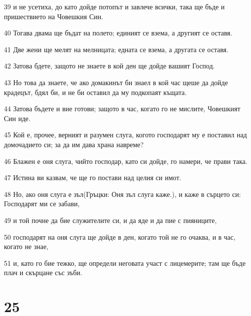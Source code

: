 \par 39 и не усетиха, до като дойде потопът и завлече всички, така ще бъде и пришествието на Човешкия Син.
\par 40 Тогава двама ще бъдат на полето; единият се взема, а другият се оставя.
\par 41 Две жени ще мелят на мелницата; едната се взема, а другата се оставя.
\par 42 Затова бдете, защото не знаете в кой ден ще дойде вашият Господ.
\par 43 Но това да знаете, че ако домакинът би знаел в кой час щеше да дойде крадецът, бдял би, и не би оставил да му подкопаят къщата.
\par 44 Затова бъдете и вие готови; защото в час, когато го не мислите, Човешкият Син иде.
\par 45 Кой е, прочее, верният и разумен слуга, когото господарят му е поставил над домочадието си; за да им дава храна навреме?
\par 46 Блажен е оня слуга, чийто господар, като си дойде, го намери, че прави така.
\par 47 Истина ви казвам, че ще го постави над целия си имот.
\par 48 Но, ако оня слуга е зъл(Гръцки: Оня зъл слуга каже.), и каже в сърцето си: Господарят ми се забави,
\par 49 и той почне да бие служителите си, и да яде и да пие с пияниците,
\par 50 господарят на оня слуга ще дойде в ден, когато той не го очаква, и в час, когато не знае,
\par 51 и, като го бие тежко, ще определи неговата участ с лицемерите; там ще бъде плач и скърцане със зъби.

\chapter{25}

